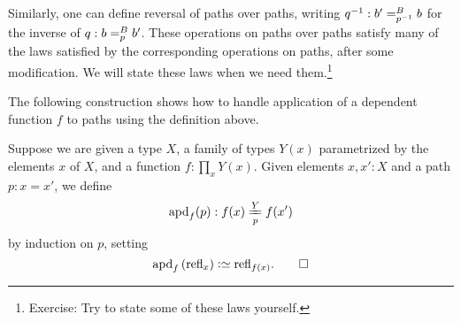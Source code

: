Similarly, one can define reversal of paths over paths,
writing $\inv q : \pathover {b'} B {\inv p} b$ for the inverse
of $q : \pathover b B p {b'}$.
These operations on paths over paths
satisfy many of the laws satisfied by the corresponding operations on paths,
after some modification.
We will state these laws when we need them.\footnote{%
  Exercise: Try to state some of these laws yourself.}

The following construction shows how to handle application of a dependent
function $f$ to paths using the definition above.

\begin{definition}\label{def:apd}
  Suppose we are given a type $X$, a family of types $Y(x)$ parametrized by the elements $x$ of $X$, and a function $f:\prod_x Y(x)$.
  Given elements $x,x':X$ and a path $p : x = x'$, we define
  \[
    \apd{f}(p) : \pathover {f(x)} Y p {f(x')}
  \]
  by induction on $p$, setting
  \[
    \apd f {(\refl x)} \defeq \refl {f(x)}.\qedhere
  \]
\end{definition}

